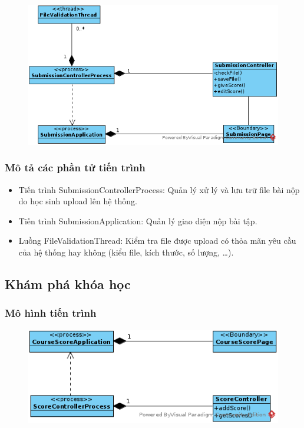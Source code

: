 \documentclass[./../main_file.tex]{subfiles}
\begin{document}
\begin{figure}[H]
	\centering
	\includegraphics[width=\linewidth]{./images/pv_submit_assignment.png}
\end{figure}

\subsubsection{Mô tả các phần tử tiến trình}

\begin{itemize}
	\item Tiến trình SubmissionControllerProcess: Quản lý xử lý và lưu trữ file bài nộp do học sinh upload lên hệ thống.
	\item Tiến trình SubmissionApplication: Quản lý giao diện nộp bài tập.
	\item Luồng FileValidationThread: Kiểm tra file được upload có thỏa mãn yêu cầu của hệ thống hay không (kiểu file, kích thước, số lượng, …).
\end{itemize}

\subsection{Khám phá khóa học}

\subsubsection{Mô hình tiến trình}

\begin{figure}[H]
	\centering
	\includegraphics[width=\linewidth]{./images/pv_check_course_progress.png}
\end{figure}
\end{document}

